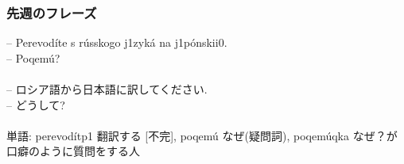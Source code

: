 \documentclass[11pt]{jsarticle}
\begin{document}
\subsubsection*{先週のフレーズ}
\noindent
\--- Perevod\'ite s r\'usskogo {j1}zyk\'a na {j1}p\'onski{i0}.\\
\--- Poqem\'u?\\
\\
\--- ロシア語から日本語に訳してください.\\
\--- どうして?\\
\\
単語: perevod\'it{p1} 翻訳する [不完], poqem\'u なぜ(疑問詞), poqem\'uqka なぜ？が口癖のように質問をする人
\end{document}
